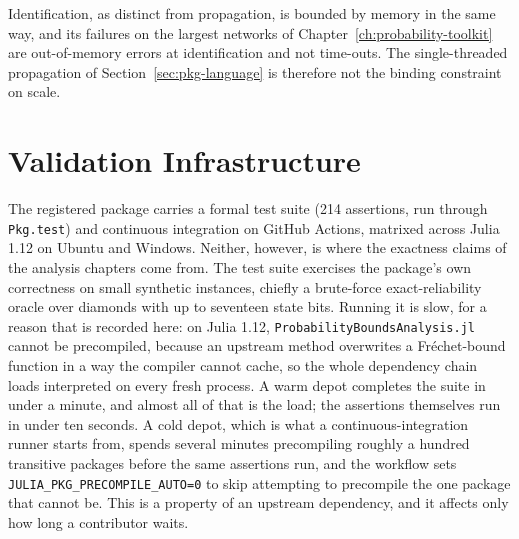 \documentclass[12pt]{report}
\begin{document}
Identification, as distinct from propagation, is bounded by memory in the same way, and
its failures on the largest networks of Chapter~\ref{ch:probability-toolkit} are out-of-memory
errors at identification and not time-outs. The single-threaded propagation of
Section~\ref{sec:pkg-language} is therefore not the binding constraint on scale.

\section{Validation Infrastructure}
\label{sec:pkg-validation}

The registered package carries a formal test suite (214 assertions, run through
\texttt{Pkg.test}) and continuous integration on GitHub Actions, matrixed across Julia 1.12
on Ubuntu and Windows. Neither, however, is where the exactness claims of the analysis
chapters come from. The test suite exercises the package's own correctness on small synthetic instances,
chiefly a brute-force exact-reliability oracle over diamonds with up to seventeen state
bits. Running it is slow, for a reason that is recorded here: on Julia 1.12,
\texttt{ProbabilityBoundsAnalysis.jl} cannot be precompiled, because an upstream method
overwrites a Fr\'{e}chet-bound function in a way the compiler cannot cache, so the whole
dependency chain loads interpreted on every fresh process. A warm depot completes the suite in under a minute, and almost all of that is the load; the
assertions themselves run in under ten seconds. A cold depot, which is what a
continuous-integration runner starts from, spends several minutes precompiling roughly a
hundred transitive packages before the same assertions run, and the workflow sets \texttt{JULIA\_PKG\_PRECOMPILE\_AUTO=0} to skip
attempting to precompile the one package that cannot be. This is a property of an upstream dependency, and it affects only how long a contributor
waits.
\end{document}
